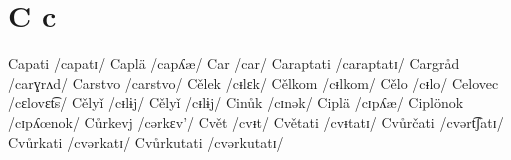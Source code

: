 \chapter{C c}

Capati /capatɪ/
Caplä /capʎæ/
Car /car/
Caraptati /caraptatɪ/
Cargråd /carɣrʌd/
Carstvo /carstvo/
Cělek /cᵻlɛk/
Cělkom /cᵻlkom/
Cělo /cᵻlo/
Celovec /cɛlovɛt͡s/
Cělyǐ /cᵻlɨj/
Cělyǐ /cᵻlɨj/
Cinůk /cɪnək/
Ciplä /cɪpʎæ/
Ciplönok /cɪpʎœnok/
Cůrkevj /cərkɛv’/
Cvět /cvᵻt/
Cvětati /cvᵻtatɪ/
Cvůrčati /cvərt͡ʃatɪ/
Cvůrkati /cvərkatɪ/
Cvůrkutati /cvərkutatɪ/
